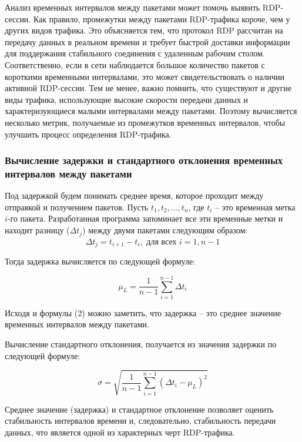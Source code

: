 \documentclass[spec, och, diploma]{SCWorks}
\begin{document}
Анализ временных интервалов между пакетами может помочь выявить RDP-сессии. Как правило, промежутки между пакетами RDP-трафика короче, 
чем у других видов трафика. Это объясняется тем, что протокол RDP рассчитан на передачу данных в реальном времени и требует быстрой 
доставки информации для поддержания стабильного соединения с удаленным рабочим столом. Соответственно, если в сети наблюдается 
большое количество пакетов с короткими временными интервалами, это может свидетельствовать о наличии активной RDP-сессии. Тем 
не менее, важно помнить, что существуют и другие виды трафика, использующие высокие скорости передачи данных и характеризующиеся 
малыми интервалами между пакетами. Поэтому вычисляется несколько метрик, получаемые из промежутков временных интервалов, чтобы улучшить
процесс определения RDP-трафика.

\subsubsection{Вычисление задержки и стандартного отклонения временных интервалов между пакетами}

Под задержкой будем понимать среднее время, которое проходит между отправкой и получением пакетов. Пусть $ t_1, t_2, \dots, t_n $, 
где $ t_i $ -- это временная метка $ i $-го пакета. Разработанная программа запоминает все эти временные метки и находит разницу ($\Delta t_j$) 
между двумя пакетами следующим образом:
\begin{equation}
  \Delta t_j = t_{i+1} - t_{i}, \text{ для всех } i = \overline{1, n - 1}
\end{equation}

Тогда задержка вычисляется по следующей формуле:

\begin{equation}
  \mu_L = \frac{1}{n - 1} \sum_{i=1}^{n-1} \Delta t_i
\end{equation}

Исходя и формулы (2) можно заметить, что задержка -- это среднее значение временных интервалов между пакетами.

Вычисление стандартного отклонения, получается из значения задержки по следующей формуле:

\begin{equation}
  \sigma = \sqrt{\frac{1}{n-1} \sum_{i=1}^{n-1} (\Delta t_i - \mu_L)^2}
\end{equation}

  Среднее значение (задержка) и стандартное отклонение позволяет оценить стабильность интервалов времени 
  и, следовательно, стабильность передачи данных, что является одной из характерных черт RDP-трафика.
\end{document}
